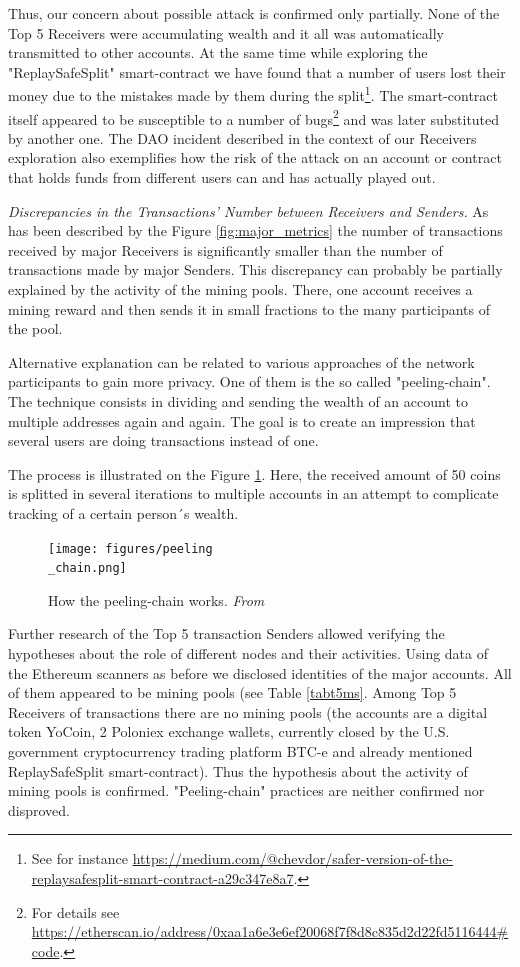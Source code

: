 Thus, our concern about possible attack is confirmed only partially.
None of the Top 5 Receivers were accumulating wealth and it all was automatically transmitted to other accounts.
At the same time while exploring the "ReplaySafeSplit" smart-contract we have found that a number of users lost their money due to the mistakes made by them during the split\footnote{See for instance \url{https://medium.com/@chevdor/safer-version-of-the-replaysafesplit-smart-contract-a29c347e8a7}.}.
The smart-contract itself appeared to be susceptible to a number of bugs\footnote{For details see \url{https://etherscan.io/address/0xaa1a6e3e6ef20068f7f8d8c835d2d22fd5116444\#code}.} and was later substituted by another one.
The DAO incident described in the context of our Receivers exploration also exemplifies how the risk of the attack on an account or contract that holds funds from different users can and has actually played out.

\textit{Discrepancies in the Transactions' Number between Receivers and Senders.} 
As has been described by the Figure \ref{fig:major_metrics} the number of transactions received by major Receivers is significantly smaller than the number of transactions made by major Senders.
This discrepancy can probably be partially explained by the activity of the mining pools.
There, one account receives a mining reward and then sends it in small fractions to the many participants of the pool.

Alternative explanation can be related to various approaches of the network participants to gain more privacy.
One of them is the so called "peeling-chain".
The technique consists in dividing and sending the wealth of an account to multiple addresses again and again.
The goal is to create an impression that several users are doing transactions instead of one.

The process is illustrated on the Figure \ref{fig:peeling_chain}.
Here, the received amount of 50 coins is splitted in several iterations to multiple accounts in an attempt to complicate tracking of a certain person´s wealth.

\begin{figure}[h]
  \centering
  \texttt{[image: figures/peeling\\\_chain.png]}
  \caption{How the peeling-chain works.
  \textit{From \cite{balthasar2017laundary}}}
  \label{fig:peeling_chain}
\end{figure}

Further research of the Top 5 transaction Senders allowed verifying the hypotheses about the role of different nodes and their activities.
Using data of the Ethereum scanners as before we disclosed identities of the major accounts. 
All of them appeared to be mining pools (see Table \ref{tabt5ms}.
Among Top 5 Receivers of transactions there are no mining pools (the accounts are a digital token YoCoin, 2 Poloniex exchange wallets, currently closed by the U.S. government cryptocurrency trading platform BTC-e and already mentioned ReplaySafeSplit smart-contract).
Thus the hypothesis about the activity of mining pools is confirmed.
"Peeling-chain" practices are neither confirmed nor disproved.

